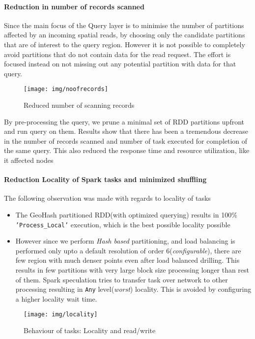 \documentclass[article,type=msc,colorback,12pt,accentcolor=tud1d]{tudthesis}
\begin{document}
		  \clearpage
			\paragraph{Reduction in number of records scanned}
			
			Since the main focus of the Query layer is to minimise the number of partitions affected by an incoming spatial reads, by choosing only the candidate partitions that are of interest to the query region. However it is not possible to completely avoid partitions that do not contain data for the read request. The effort is focused instead on not missing out any potential partition with data for that query. 
	
				\begin{figure}[h]
				\centering
				\texttt{[image: img/noofrecords]}
				\caption{Reduced number of scanning records}
				\label{fig:noofrecords}
				\end{figure}

			By pre-processing the query, we prune a minimal set of RDD partitions upfront and run query on them. Results show that there has been a tremendous decrease in the number of records scanned and number of task executed for completion of the same query.  This also reduced the response time and resource utilization, like it affected nodes 			
			
			\clearpage
			\paragraph{Reduction Locality of Spark tasks and minimized shuffling}
			The following observation was made with regards to locality of tasks 
			\begin{itemize}
				\item The GeoHash partitioned RDD(with optimized querying) results in 100\%  \texttt{'Process\_Local'} execution, which is the best possible locality possible
				\item However since we perform \textit{Hash based} partitioning, and load balancing is performed only upto a default resolution of order 6(\textit{configurable}), there are few region with much denser points even after load balanced drilling. This results in few partitions with very large block size processing longer than rest of them. Spark speculation tries to transfer task over network to other processing resulting in \texttt{Any} level(\textit{worst}) locality. This is avoided by configuring a higher locality wait time. 
			\end{itemize}
				\begin{figure}[h]
				\centering
				\texttt{[image: img/locality]}
				\caption{Behaviour of tasks: Locality and read/write}
				\label{fig:locality}
				\end{figure}
			\clearpage
\end{document}
